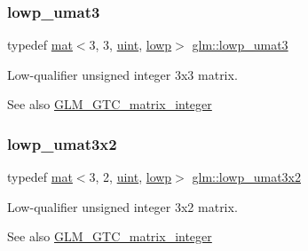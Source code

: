 \subsubsection{\texorpdfstring{lowp\+\_\+umat3}{lowp\_umat3}}
{\footnotesize\ttfamily typedef \hyperlink{structglm_1_1mat}{mat}$<$3, 3, \hyperlink{group__core__precision_ga4fd29415871152bfb5abd588334147c8}{uint}, \hyperlink{namespaceglm_a36ed105b07c7746804d7fdc7cc90ff25ae161af3fc695e696ce3bf69f7332bc2d}{lowp}$>$ \hyperlink{group__gtc__matrix__integer_gaab0c883cd04a3684accd02854daa7b1d}{glm\+::lowp\+\_\+umat3}}

Low-\/qualifier unsigned integer 3x3 matrix. \begin{DoxySeeAlso}{See also}
\hyperlink{group__gtc__matrix__integer}{G\+L\+M\+\_\+\+G\+T\+C\+\_\+matrix\+\_\+integer} 
\end{DoxySeeAlso}
\mbox{\label{group__gtc__matrix__integer_ga8beb1d63e9d2abe5659fe53ac064c6c5}} 
\subsubsection{\texorpdfstring{lowp\+\_\+umat3x2}{lowp\_umat3x2}}
{\footnotesize\ttfamily typedef \hyperlink{structglm_1_1mat}{mat}$<$3, 2, \hyperlink{group__core__precision_ga4fd29415871152bfb5abd588334147c8}{uint}, \hyperlink{namespaceglm_a36ed105b07c7746804d7fdc7cc90ff25ae161af3fc695e696ce3bf69f7332bc2d}{lowp}$>$ \hyperlink{group__gtc__matrix__integer_ga8beb1d63e9d2abe5659fe53ac064c6c5}{glm\+::lowp\+\_\+umat3x2}}

Low-\/qualifier unsigned integer 3x2 matrix. \begin{DoxySeeAlso}{See also}
\hyperlink{group__gtc__matrix__integer}{G\+L\+M\+\_\+\+G\+T\+C\+\_\+matrix\+\_\+integer} 
\end{DoxySeeAlso}
\mbox{\label{group__gtc__matrix__integer_ga267cf15202746fe0bd9b493ce2e98652}} 
